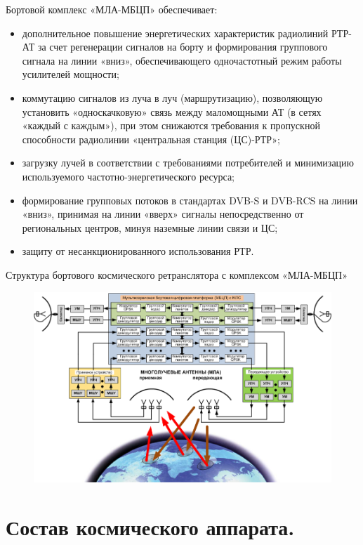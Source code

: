 \documentclass[14pt,a4paper,oneside]{extarticle}
\begin{document}
Бортовой комплекс «МЛА-МБЦП» обеспечивает:

\begin{itemize}
    \item дополнительное повышение энергетических характеристик радиолиний РТР-АТ за счет регенерации сигналов на борту и формирования группового сигнала на линии «вниз», обеспечивающего одночастотный режим работы усилителей мощности;
    \item коммутацию сигналов из луча в луч (маршрутизацию), позволяющую установить «односкачковую» связь между маломощными АТ (в сетях «каждый с каждым»), при этом снижаются требования к пропускной способности радиолинии «центральная станция (ЦС)-РТР»;
    \item загрузку лучей в соответствии с требованиями потребителей и минимизацию используемого частотно-энергетического ресурса;
    \item формирование групповых потоков в стандартах DVB-S и DVB-RCS на линии «вниз», принимая на линии «вверх» сигналы непосредственно от региональных центров, минуя наземные линии связи и ЦС;
    \item защиту от несанкционированного использования РТР.
\end{itemize}

Структура бортового космического ретранслятора с комплексом «МЛА-МБЦП»

\begin{figure}[H]
    \begin{center}
        \includegraphics[width=\textwidth]{imgs/4}
    \end{center}
\end{figure}

\section{Состав космического аппарата.}
\end{document}
